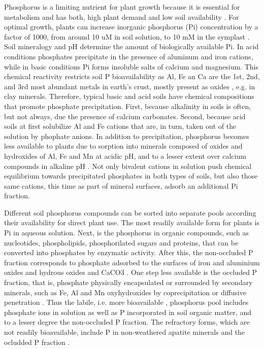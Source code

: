 \documentclass[10pt,letterpaper]{article}
\begin{document}
Phosphorus is a limiting nutrient for plant growth because it is essential for metabolism and has both, high plant demand and low soil availability \cite{Agren:2012kg}. For optimal growth, plants can increase inorganic phosphorus (Pi) concentration by a factor of 1000, from around 10 uM in soil solution, to 10 mM in the symplast \cite{Lambers:2015ut,Schachtman:1998vv}. Soil mineralogy and pH determine the amount of biologically available Pi. In acid conditions phosphates precipitate in the presence of aluminum and iron cations, while in basic conditions Pi forms insoluble salts of calcium and magnesium. This chemical reactivity restricts soil P bioavailability as Al, Fe an Ca are the 1st, 2nd, and 3rd most abundant metals in earth's crust, mostly present as oxides \cite{Rudnick:QE13oOmz}, e.g. in clay minerals. Therefore, typical basic and acid soils have chemical compositions that promote phosphate precipitation. First, because alkalinity in soils is often, but not always, due the presence of calcium carbonates. Second, because acid soils at first solubilize Al and Fe cations that are, in turn, taken out of the solution by phophate anions. In addition to precipitation, phosphorus becomes less available to plants due to sorption into minerals composed of oxides and hydroxides of Al, Fe and Mn at acidic pH, and to a lesser extent over calcium compounds in alkaline pH \cite{Prasad:2016ca}. Not only bivalent cations in solution push chemical equilibrium towards precipitated phosphates in both types of soils, but also those same cations, this time as part of mineral surfaces, adsorb an additional Pi fraction. 

Different soil phosphorus compounds can be sorted into separate pools according their availability for direct plant use. The most readily available form for plants is Pi in aqueous solution. Next, is the phosphorus in organic compounds, such as nucleotides, phospholipids, phosphorilated sugars and proteins, that can be converted into phosphates by enzymatic activity. After this, the non-occluded P fraction corresponds to phosphate adsorbed to the surfaces of iron and aluminium oxides and hydrous oxides and CaCO3 \cite{WALKER19761}. One step less available is the occluded P fraction, that is, phosphate physically encapsulated or surrounded by secondary minerals, such as Fe, Al and Mn oxyhydroxides \cite{Yang:2013ft,Filipelli:6Zj8wyph} by coprecipitation or diffusive penetration \cite{WALKER19761}. Thus the labile, i.e. more bioavailable \cite{Yang:2013ft}, phosphorus pool includes phosphate ions in solution as well as P incorporated in soil organic matter, and to a lesser degree the non-occluded P fraction. The refractory forms, which are not readily bioavailable, include P in non-weathered apatite minerals and the ocludded P fraction \cite{Filipelli:6Zj8wyph}. 
\end{document}
